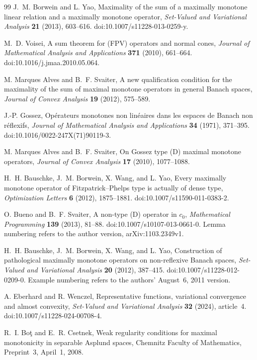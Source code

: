 \begin{thebibliography}{99}
J.~M. Borwein and L. Yao,
Maximality of the sum of a maximally monotone linear relation and a
maximally monotone operator,
\emph{Set-Valued and Variational Analysis} \textbf{21} (2013), 603--616.
doi:10.1007/s11228-013-0259-y.

M.~D. Voisei,
A sum theorem for (FPV) operators and normal cones,
\emph{Journal of Mathematical Analysis and Applications}
\textbf{371} (2010), 661--664.
doi:10.1016/j.jmaa.2010.05.064.

M. Marques Alves and B.~F. Svaiter,
A new qualification condition for the maximality of the sum of maximal
monotone operators in general Banach spaces,
\emph{Journal of Convex Analysis} \textbf{19} (2012), 575--589.

J.-P. Gossez,
Op\'{e}rateurs monotones non lin\'{e}aires dans les espaces de Banach non r\'{e}flexifs,
\emph{Journal of Mathematical Analysis and Applications}
\textbf{34} (1971), 371--395.
doi:10.1016/0022-247X(71)90119-3.

M. Marques Alves and B.~F. Svaiter,
On Gossez type (D) maximal monotone operators,
\emph{Journal of Convex Analysis} \textbf{17} (2010), 1077--1088.

H.~H. Bauschke, J.~M. Borwein, X. Wang, and L. Yao,
Every maximally monotone operator of Fitzpatrick--Phelps type is actually
of dense type,
\emph{Optimization Letters} \textbf{6} (2012), 1875--1881.
doi:10.1007/s11590-011-0383-2.

O. Bueno and B.~F. Svaiter,
A non-type (D) operator in $c_0$,
\emph{Mathematical Programming} \textbf{139} (2013), 81--88.
doi:10.1007/s10107-013-0661-0.
Lemma numbering refers to the author version, arXiv:1103.2349v1.

H.~H. Bauschke, J.~M. Borwein, X. Wang, and L. Yao,
Construction of pathological maximally monotone operators on
non-reflexive Banach spaces,
\emph{Set-Valued and Variational Analysis} \textbf{20} (2012), 387--415.
doi:10.1007/s11228-012-0209-0.
Example numbering refers to the authors' August~6, 2011 version.

A. Eberhard and R. Wenczel,
Representative functions, variational convergence and almost convexity,
\emph{Set-Valued and Variational Analysis} \textbf{32} (2024), article~4.
doi:10.1007/s11228-024-00708-4.

R.~I. Bo\c{t} and E.~R. Csetnek,
Weak regularity conditions for maximal monotonicity in separable
Asplund spaces,
Chemnitz Faculty of Mathematics, Preprint~3, April~1, 2008.


\end{thebibliography}
